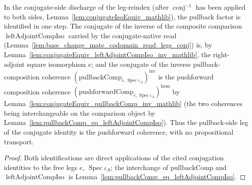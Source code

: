 \begin{lemma}

  \label{lem:base_change_mate_reindex_conj_pullbackLeg}
  In the conjugate-side discharge of the leg-reindex (after
  \(\operatorname{conj}^{-1}\) has been applied to both sides, Lemma~\ref{lem:conjugateIsoEquiv_mathlib}),
  the pullback factor is identified in one step. The conjugate of the inverse of the composite
  comparison \(\operatorname{leftAdjointCompIso}\) carried by the conjugate-native read
  (Lemma~\ref{lem:base_change_mate_codomain_read_legs_conj}) is, by
  Lemma~\ref{lem:conjugateEquiv_leftAdjointCompIso_inv_mathlib}, the right-adjoint square isomorphism
  \(e\); and the conjugate of the inverse pullback-composition coherence
  \((\mathrm{pullbackComp}_{e,\operatorname{Spec}\iota_A})^{\mathrm{inv}}\) is the pushforward
  composition coherence \((\mathrm{pushforwardComp}_{e,\operatorname{Spec}\iota_A})^{\mathrm{hom}}\) by
  Lemma~\ref{lem:conjugateEquiv_pullbackComp_inv_mathlib} (the two coherences being interchangeable on
  the comparison object by Lemma~\ref{lem:pullbackComp_eq_leftAdjointCompIso}). Thus the pullback-side
  leg of the conjugate identity is the pushforward coherence, with no propositional transport.
\end{lemma}

\begin{proof}
  Both identifications are direct applications of the cited conjugation identities to the free legs
  \(e\), \(\operatorname{Spec}\iota_A\); the interchange of \(\mathrm{pullbackComp}\) and
  \(\operatorname{leftAdjointCompIso}\) is Lemma~\ref{lem:pullbackComp_eq_leftAdjointCompIso}.
\end{proof}

